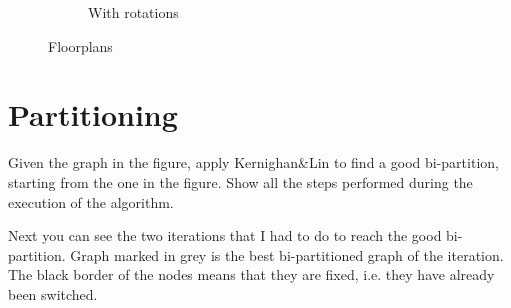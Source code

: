 \documentclass[a4paper, 10pt]{article}
\begin{document}
\begin{figure}[H]
\begin{subfigure}{0.45\textwidth}
        \caption{With rotations}
        \label{fig:f2}
    \end{subfigure}
    \caption{Floorplans}
\end{figure}

\section{Partitioning}

{\color{statement} Given the graph in the figure, apply Kernighan\&Lin to find a good bi-partition, starting from the one in the figure. Show all the steps performed during the execution of the algorithm.}

Next you can see the two iterations that I had to do to reach the good bi-partition. Graph marked in grey is the best bi-partitioned graph of the iteration. The black border of the nodes means that they are fixed, i.e. they have already been switched.
\end{document}
